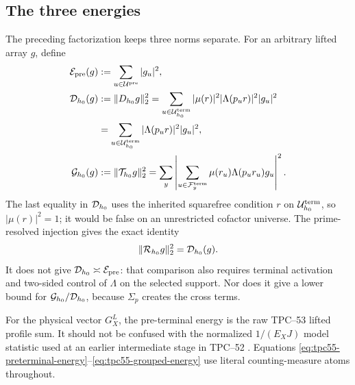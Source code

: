 \subsection{The three energies}

The preceding factorization keeps three norms separate.  For an arbitrary
lifted array \(g\), define
\begin{align}
 \mathcal E_{\rm pre}(g)
 &:=\sum_{u\in\mathcal U^{\rm pre}}|g_u|^2,
 \label{eq:tpc55-preterminal-energy}\\
 \mathcal D_{h_0}(g)
 &:=\|D_{h_0}g\|_2^2
 =\sum_{u\in\mathcal U_{h_0}^{\rm term}}
   |\mu(r)|^2|\Lambda(p_ur)|^2|g_u|^2\notag\\
 &=\sum_{u\in\mathcal U_{h_0}^{\rm term}}
   |\Lambda(p_ur)|^2|g_u|^2,
 \label{eq:tpc55-terminal-diagonal-energy}\\
 \mathcal G_{h_0}(g)
 &:=\|\mathcal T_{h_0}g\|_2^2
 =\sum_y\left|\sum_{u\in\mathcal F_y^{\rm term}}
   \mu(r_u)\Lambda(p_ur_u)g_u\right|^2.
 \label{eq:tpc55-grouped-energy}
\end{align}
The last equality in \(\mathcal D_{h_0}\) uses the inherited squarefree
condition \(r\) on \(\mathcal U_{h_0}^{\rm term}\), so
\(|\mu(r)|^2=1\); it would be false on an unrestricted cofactor universe.
The prime-resolved injection gives the exact identity
\begin{equation}
 \|\mathcal R_{h_0}g\|_2^2=\mathcal D_{h_0}(g).
 \label{eq:tpc55-resolved-isometry}
\end{equation}
It does not give \(\mathcal D_{h_0}\asymp\mathcal E_{\rm pre}\): that comparison also
requires terminal activation and two-sided control of \(\Lambda\) on the
selected support.  Nor does it give a lower bound for
\(\mathcal G_{h_0}/\mathcal D_{h_0}\), because \(\Sigma_p\) creates the cross terms.

For the physical vector \(G_X^L\), the pre-terminal energy is the raw
TPC--53 lifted profile sum.  It should not be confused with the normalized
\(1/(E_XJ)\) model statistic used at an earlier intermediate stage in
TPC--52 \citep{WangTPC52}.  Equations
\eqref{eq:tpc55-preterminal-energy}--\eqref{eq:tpc55-grouped-energy} use
literal counting-measure atoms throughout.
